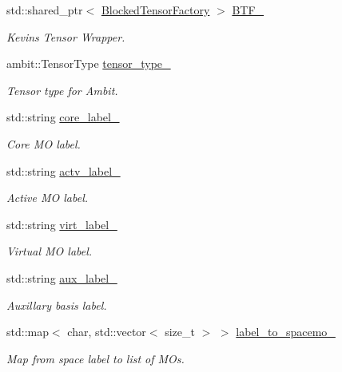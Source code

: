 \begin{DoxyCompactItemize}
std\+::shared\+\_\+ptr$<$ \mbox{\hyperlink{classforte_1_1_blocked_tensor_factory}{Blocked\+Tensor\+Factory}} $>$ \mbox{\hyperlink{classforte_1_1_s_a_d_s_r_g_afda18e917cb5340050210ea423be1b81}{B\+T\+F\+\_\+}}
\begin{DoxyCompactList}\small\item\em Kevin\textquotesingle{}s Tensor Wrapper. \end{DoxyCompactList}\item 
ambit\+::\+Tensor\+Type \mbox{\hyperlink{classforte_1_1_s_a_d_s_r_g_a6dd192c435e11ff2e0a494b52634e5ad}{tensor\+\_\+type\+\_\+}}
\begin{DoxyCompactList}\small\item\em Tensor type for Ambit. \end{DoxyCompactList}\item 
std\+::string \mbox{\hyperlink{classforte_1_1_s_a_d_s_r_g_abd5192922eb3f664edce13422255162a}{core\+\_\+label\+\_\+}}
\begin{DoxyCompactList}\small\item\em Core MO label. \end{DoxyCompactList}\item 
std\+::string \mbox{\hyperlink{classforte_1_1_s_a_d_s_r_g_a38c1f0b25c0fbc8301316047e0089eec}{actv\+\_\+label\+\_\+}}
\begin{DoxyCompactList}\small\item\em Active MO label. \end{DoxyCompactList}\item 
std\+::string \mbox{\hyperlink{classforte_1_1_s_a_d_s_r_g_aeacde1f39c4b2694200072a5c83019b1}{virt\+\_\+label\+\_\+}}
\begin{DoxyCompactList}\small\item\em Virtual MO label. \end{DoxyCompactList}\item 
std\+::string \mbox{\hyperlink{classforte_1_1_s_a_d_s_r_g_a1a27ef24b730ad88afcc3007e91a4295}{aux\+\_\+label\+\_\+}}
\begin{DoxyCompactList}\small\item\em Auxillary basis label. \end{DoxyCompactList}\item 
std\+::map$<$ char, std\+::vector$<$ size\+\_\+t $>$ $>$ \mbox{\hyperlink{classforte_1_1_s_a_d_s_r_g_a7b241d332584ea7020ee3f63d1ea39a2}{label\+\_\+to\+\_\+spacemo\+\_\+}}
\begin{DoxyCompactList}\small\item\em Map from space label to list of M\+Os. \end{DoxyCompactList}\item 

\end{DoxyCompactItemize}
